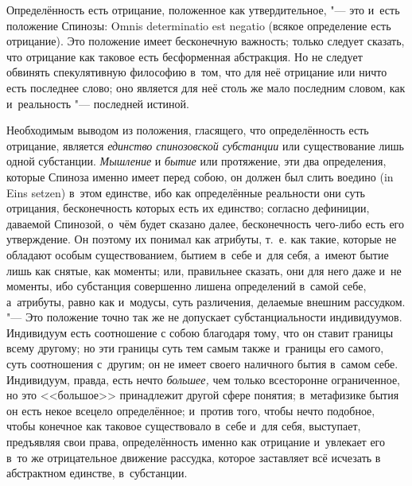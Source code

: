Определённость есть отрицание, положенное как утвердительное, "--- это и~есть
положение Спинозы: Omnis deter\-minatio est negatio (всякое определение есть
отрицание). Это положение имеет
бесконечную важность; только следует сказать, что отрицание как таковое
есть бесформенная абстракция. Но не следует обвинять спекулятивную
философию в~том, что для неё отрицание или ничто есть последнее слово; оно
является для неё столь же мало последним словом, как и~реальность
"--- последней истиной.

Необходимым выводом из положения, гласящего, что определённость есть
отрицание, является {\em единство спинозовской
субстанции} или существование лишь одной субстанции.
{\em Мышление} и {\em бытие} или
протяжение, эти два определения, которые Спиноза именно имеет перед собою,
он должен был слить воедино (in Eins setzen) в~этом единстве, ибо как
определённые реальности они суть отрицания, бесконечность которых есть их
единство; согласно дефиниции, даваемой Спинозой, о~чём будет сказано далее,
бесконечность чего-либо есть его утверждение. Он поэтому их понимал как
атрибуты, т.~е. как такие, которые не обладают особым существованием,
бытием в~себе и~для себя, а~имеют бытие лишь как снятые, как моменты; или,
правильнее сказать, они для него даже и~не моменты, ибо субстанция
совершенно лишена определений в~самой себе, а~атрибуты, равно как и~модусы,
суть различения, делаемые внешним рассудком. "--- Это положение точно так же
не допускает субстанциальности индивидуумов. Индивидуум есть соотношение с
собою благодаря тому, что он ставит границы всему другому; но эти границы
суть тем самым также и~границы его самого, суть соотношения с~другим; он не
имеет своего наличного бытия в~самом себе. Индивидуум, правда, есть нечто
{\em большее,} чем только всесторонне ограниченное, но
это <<большое>> принадлежит другой сфере понятия; в~метафизике бытия он есть
некое всецело определённое; и~против того, чтобы нечто подобное, чтобы
конечное как таковое существовало в~себе и~для себя, выступает, предъявляя
свои права, определённость именно как отрицание и~увлекает его в~то же
отрицательное движение рассудка, которое заставляет всё исчезать в
абстрактном единстве, в~субстанции.

